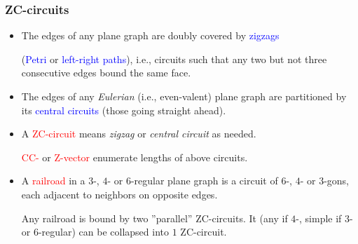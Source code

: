 \documentclass{beamer}
\begin{document}
\begin{frame}\frametitle{ZC-circuits}
\vspace{-3.5mm}  
\begin{itemize}
\item The edges of any plane
graph are doubly covered by  \textcolor{blue}{zigzags} 

(\textcolor{blue}{Petri} or 
 \textcolor{blue}{left-right paths}), i.e., 
circuits such that   any two but not three consecutive edges bound the same face.
\item The edges of any {\em Eulerian} (i.e., even-valent) plane
graph are partitioned by its \textcolor{blue}{central circuits}
 (those
going straight ahead).
\item A \textcolor{red}{ZC-circuit} means {\em zigzag} or {\em central circuit} as
needed.

\textcolor{red}{CC-} or \textcolor{red}{ Z-vector} enumerate lengths of above circuits.
\pause


\item A \textcolor{red}{railroad} in a $3$-, $4$- or $6$-regular plane 
graph is
a circuit of $6$-, $4$- or  $3$-gons, each
adjacent to neighbors on
opposite
edges.

Any railroad is bound by two ''parallel'' ZC-circuits. It (any if 
$4$-, simple if $3$- or $6$-regular) can be collapsed 
into  $1$ ZC-circuit.
\end{itemize}


\end{frame}
\end{document}
